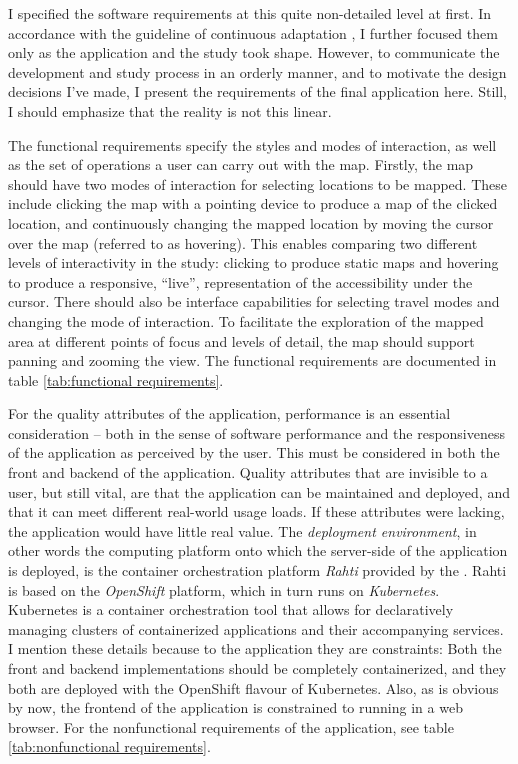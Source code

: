 I specified the software requirements at this quite non-detailed
level at first.
In accordance with the guideline of continuous adaptation \parencite{bec2001, mar2009},
I further focused them only as the application and the study took shape.
However, to communicate the development and study process in an orderly manner,
and to motivate the design decisions I've made,
I present the requirements of the final application here.
Still, I should emphasize that the reality is not this linear.

The functional requirements specify the styles and modes of interaction,
as well as the set of operations a user can carry out with the map.
Firstly, the map should have two modes of interaction for selecting locations to be mapped.
These include clicking the map with a pointing device to produce a map of the clicked location,
and continuously changing the mapped location by moving the cursor over the map
(referred to as hovering).
This enables comparing two different levels of interactivity in the study:
clicking to produce static maps and hovering to produce
a responsive, \enquote{live},
representation of the accessibility under the cursor.
There should also be interface capabilities for selecting travel modes
and changing the mode of interaction.
To facilitate the exploration of the mapped area
at different points of focus and levels of detail,
the map should support panning and zooming the view.
The functional requirements are documented in table \ref{tab:functional requirements}.

For the quality attributes of the application,
performance is an essential consideration --
both in the sense of software performance
and the responsiveness of the application as perceived by the user.
This must be considered in both the front and backend of the application.
Quality attributes that are invisible to a user, but still vital,
are that the application can be maintained and deployed,
and that it can meet different real-world usage loads.
If these attributes were lacking,
the application would have little real value.
The \textit{deployment environment},
in other words the computing platform onto which the server-side of the application is deployed,
is the container orchestration platform \textit{Rahti} provided by the .
Rahti is based on the \textit{OpenShift} platform,
which in turn runs on \textit{Kubernetes}.
Kubernetes is a container orchestration tool
that allows for declaratively managing clusters
of containerized applications and their accompanying services.
I mention these details because to the application they are constraints:
Both the front and backend implementations should be completely containerized,
and they both are deployed with the OpenShift flavour of Kubernetes.
Also, as is obvious by now,
the frontend of the application is constrained to running in a web browser.
For the nonfunctional requirements of the application,
see table \ref{tab:nonfunctional requirements}.

